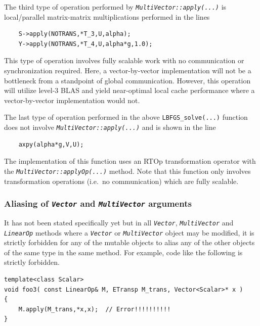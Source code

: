 The third type of operation performed by
\texttt{\textit{Multi\-Vector\-::apply(\-...)}} is local/parallel matrix-matrix
multiplications performed in the lines

{\scriptsize\begin{verbatim}
    S->apply(NOTRANS,*T_3,U,alpha);
    Y->apply(NOTRANS,*T_4,U,alpha*g,1.0);
\end{verbatim}}

\noindent This type of operation involves fully scalable work with no
communication or synchronization required.  Here, a vector-by-vector
implementation will not be a bottleneck from a standpoint of global
communication.  However, this operation will utilize level-3 BLAS and
yield near-optimal local cache performance where a vector-by-vector
implementation would not.

The last type of operation performed in the above
\texttt{LBFGS\_solve(...)}  function does not involve
\texttt{\textit{Multi\-Vector\-::apply(\-...)}} and is shown in the line

{\scriptsize\begin{verbatim}
    axpy(alpha*g,V,U);
\end{verbatim}}

\noindent The implementation of this function uses an RTOp transformation
operator with the \texttt{\textit{Multi\-Vector\-::applyOp(\-...)}}
method.  Note that this function only involves transformation
operations (i.e.~no communication) which are fully scalable.

%
\subsubsection{Aliasing of \texttt{\textit{Vector}} and \texttt{\textit{Multi\-Vector}} arguments}
\label{tsfcore:sec:aliasing}
%

It has not been stated specifically yet but in all
\texttt{\textit{Vector}}, \texttt{\textit{Multi\-Vector}} and
\texttt{\textit{LinearOp}} methods where a \texttt{\textit{Vector}} or
\texttt{\textit{Multi\-Vector}} object may be modified, it is strictly
forbidden for any of the mutable objects to alias any of the other
objects of the same type in the same method.  For example, code like the
following is strictly forbidden.

{\scriptsize\begin{verbatim}
template<class Scalar>
void foo3( const LinearOp& M, ETransp M_trans, Vector<Scalar>* x )
{
    M.apply(M_trans,*x,x);  // Error!!!!!!!!!!
}
\end{verbatim}}

